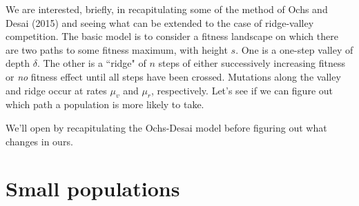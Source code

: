 \documentclass[11pt]{revtex4}
\begin{document}
We are interested, briefly, in recapitulating some of the method of Ochs and Desai (2015) and seeing what can be extended to the case of ridge-valley competition.
The basic model is to consider a fitness landscape on which there are two paths to some fitness maximum, with height $s$.
One is a one-step valley of depth $\delta$.
The other is a ``ridge" of $n$ steps of either successively increasing fitness or \emph{no} fitness effect until all steps have been crossed.
Mutations along the valley and ridge occur at rates $\mu_v$ and $\mu_r$, respectively.
Let's see if we can figure out which path a population is more likely to take.

We'll open by recapitulating the Ochs-Desai model before figuring out what changes in ours.

\section*{Small populations}
\end{document}
